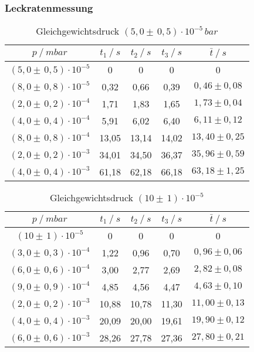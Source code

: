 \subsubsection{Leckratenmessung}
\begin{table}[H]
\centering
\label{tab:leck_Turbo1}
\begin{tabular}{c|c|c|c|c}
	{$p \:/\: \si{mbar}$} & {$t_1 \:/\: \si{s} $} & {$t_2 \:/\: \si{s} $} & {$t_3 \:/\: \si{s} $} & {$\bar{t} \:/\: \si{s}$}\\
\midrule
$(5,0 \pm \, 0,5)\cdot 10^{-5}$ &0 &0 &0 &0\\
$(8,0 \pm \, 0,8)\cdot 10^{-5}$ &   0,32 &  0,66 &  0,39 & $0,46 \pm 0,08$\\
$(2,0 \pm \, 0,2)\cdot 10^{-4}$ &   1,71  &  1,83 &  1,65 & $1,73 \pm 0,04 $\\
$(4,0 \pm \, 0,4)\cdot 10^{-4}$ &   5,91 &  6,02 &  6,40 & $6,11 \pm 0,12 $\\
$(8,0 \pm \, 0,8)\cdot 10^{-4}$  &   13,05 &  13,14 &  14,02 & $13,40 \pm 0,25 $\\
$(2,0 \pm \, 0,2)\cdot 10^{-3}$ &   34,01 &  34,50 &  36,37 & $35,96 \pm 0,59 $\\
$(4,0 \pm \, 0,4)\cdot 10^{-3}$ &  61,18 & 62,18 & 66,18 & $63,18 \pm 1,25 $\\
\end{tabular}
\caption{Gleichgewichtsdruck $(5,0 \pm \, 0,5)\cdot 10^{-5} \, \si{bar}$}
\end{table}

\begin{table}[H]
\centering
\label{tab:leck_Turbo2}
\begin{tabular}{c|c|c|c|c}
	{$p \:/\: \si{mbar}$} & {$t_1 \:/\: \si{s} $} & {$t_2 \:/\: \si{s} $} & {$t_3 \:/\: \si{s} $} & {$\bar{t} \:/\: \si{s}$}\\
\midrule
$(10 \pm \, 1)\cdot 10^{-5}$ &0 &0 &0 &0\\
$(3,0 \pm \, 0,3)\cdot 10^{-4}$ &   1,22 &  0,96 &  0,70 & $0,96 \pm 0,06$\\
$(6,0 \pm \, 0,6)\cdot 10^{-4}$ &   3,00  &  2,77 &  2,69 & $2,82 \pm 0,08 $\\
$(9,0 \pm \, 0,9)\cdot 10^{-4}$ &   4,85 &  4,56 &  4,47 & $4,63 \pm 0,10 $\\
$(2,0 \pm \, 0,2)\cdot 10^{-3}$  &   10,88 &  10,78 &  11,30 & $11,00 \pm 0,13 $\\
$(4,0 \pm \, 0,4)\cdot 10^{-3}$ &   20,09 &  20,00 &  19,61 & $19,90 \pm 0,12 $\\
$(6,0 \pm \, 0,6)\cdot 10^{-3}$ &  28,26 & 27,78 & 27,36 & $27,80 \pm 0,21 $\\
\end{tabular}
\caption{Gleichgewichtsdruck $(10 \pm \, 1)\cdot 10^{-5}$}
\end{table}


